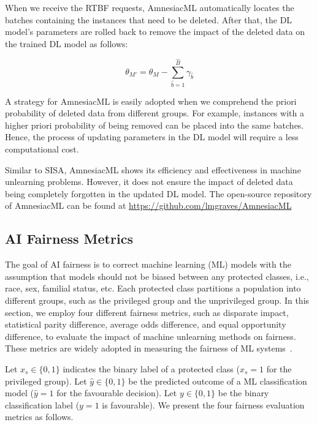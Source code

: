 When we receive the RTBF requests, AmnesiacML automatically locates the batches containing the instances that need to be deleted. After that, the DL model's parameters are rolled back to remove the impact of the deleted data on the trained DL model as follows: 

\begin{equation}
\theta_{M'} = \theta_{M} - \sum_{\hat{b}=1}^{\hat{B}}\gamma_{\hat{b}}
\label{amnesiac-update}
\end{equation}

A strategy for AmnesiacML is easily adopted when we comprehend the priori probability of deleted data from different groups. For example, instances with a higher priori probability of being removed can be placed into the same batches. Hence, the process of updating parameters in the DL model will require a less computational cost. 


Similar to SISA, AmnesiacML shows its efficiency and effectiveness in machine unlearning problems. However, it does not ensure the impact of deleted data being completely forgotten in the updated DL model. The open-source repository of AmnesiacML can be found at \url{https://github.com/lmgraves/AmnesiacML}


\subsection{AI Fairness Metrics}
\label{sec:ai_metrics}


The goal of AI fairness is to correct machine learning (ML) models with the assumption that models should not be biased between any protected classes, i.e., race, sex, familial status, etc. Each protected class partitions a population into different groups, such as the privileged group and the unprivileged group. 
In this section, we employ four different fairness metrics, such as disparate impact, statistical parity difference, average odds difference, and equal opportunity difference, to evaluate the impact of machine unlearning methods on fairness. These metrics are widely adopted in measuring the fairness of ML systems~\cite{fairness-re, RE-AI, fairness-survey, fairness-testing, zhang2021ignorance, biswas2020machine, dwork2012fairness, chakraborty2020fairway}.

Let $x_s \in \{0, 1\}$ indicates the binary label of a protected class ($x_s = 1$ for the privileged group). Let $\hat{y} \in \{0, 1\}$ be the predicted outcome of a ML classification model ($\hat{y}=1$ for the favourable decision). Let $y \in \{0, 1\}$ be the binary classification label ($y=1$ is favourable). We present the four fairness evaluation metrics as follows. 


